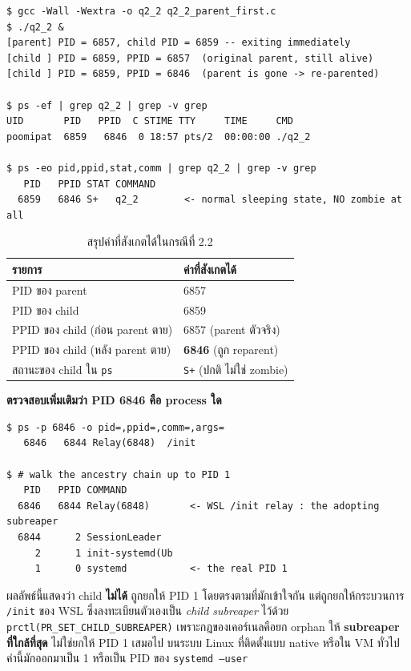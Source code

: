 \documentclass[a4paper,12pt]{article}
\newcommand{\code}[1]{\texttt{#1}}
\begin{document}
\begin{lstlisting}[style=terminal,caption={ผลลัพธ์และสถานะจาก \texttt{ps} ในกรณีที่ 2.2}]
$ gcc -Wall -Wextra -o q2_2 q2_2_parent_first.c
$ ./q2_2 &
[parent] PID = 6857, child PID = 6859 -- exiting immediately
[child ] PID = 6859, PPID = 6857  (original parent, still alive)
[child ] PID = 6859, PPID = 6846  (parent is gone -> re-parented)

$ ps -ef | grep q2_2 | grep -v grep
UID       PID   PPID  C STIME TTY     TIME     CMD
poomipat  6859   6846  0 18:57 pts/2  00:00:00 ./q2_2

$ ps -eo pid,ppid,stat,comm | grep q2_2 | grep -v grep
   PID   PPID STAT COMMAND
  6859   6846 S+   q2_2        <- normal sleeping state, NO zombie at all
\end{lstlisting}

\begin{table}[H]
\centering
\caption{สรุปค่าที่สังเกตได้ในกรณีที่ 2.2}
\begin{tabular}{ll}
\toprule
\textbf{รายการ} & \textbf{ค่าที่สังเกตได้} \\
\midrule
PID ของ parent & 6857 \\
PID ของ child & 6859 \\
PPID ของ child (ก่อน parent ตาย) & 6857 \quad (parent ตัวจริง) \\
PPID ของ child (หลัง parent ตาย) & \textbf{6846} \quad (ถูก reparent) \\
สถานะของ child ใน \code{ps} & \code{S+} (ปกติ ไม่ใช่ zombie) \\
\bottomrule
\end{tabular}
\end{table}

\textbf{ตรวจสอบเพิ่มเติมว่า PID 6846 คือ process ใด}

\begin{lstlisting}[style=terminal,caption={สายบรรพบุรุษของ process ที่รับ orphan ไปดูแล}]
$ ps -p 6846 -o pid=,ppid=,comm=,args=
   6846   6844 Relay(6848)  /init

$ # walk the ancestry chain up to PID 1
   PID   PPID COMMAND
  6846   6844 Relay(6848)       <- WSL /init relay : the adopting subreaper
  6844      2 SessionLeader
     2      1 init-systemd(Ub
     1      0 systemd           <- the real PID 1
\end{lstlisting}

ผลลัพธ์นี้แสดงว่า child \textbf{ไม่ได้} ถูกยกให้ PID 1 โดยตรงตามที่มักเข้าใจกัน
แต่ถูกยกให้กระบวนการ \code{/init} ของ WSL ซึ่งลงทะเบียนตัวเองเป็น
\emph{child subreaper} ไว้ด้วย \code{prctl(PR\_SET\_CHILD\_SUBREAPER)}
เพราะกฎของเคอร์เนลคือยก orphan ให้ \textbf{subreaper ที่ใกล้ที่สุด}
ไม่ใช่ยกให้ PID 1 เสมอไป บนระบบ Linux ที่ติดตั้งแบบ native หรือใน VM ทั่วไป
ค่านี้มักออกมาเป็น 1 หรือเป็น PID ของ \code{systemd --user}
\end{document}
